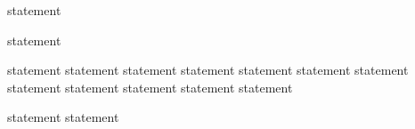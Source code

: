 {statement}

{statement}

{statement}
{statement}
{statement}
{statement}
{statement}
{statement}
{statement}
{statement}
{statement}
{statement}
{statement}
{statement}

{statement}
{statement}

